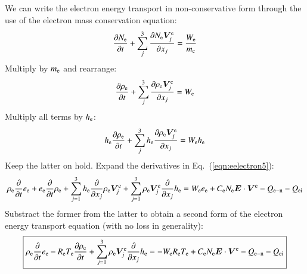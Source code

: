 \documentclass{warpdoc}
\newcommand\frameeqn[1]{\fbox{$\displaystyle #1$}}
\renewcommand{\vec}[1]{\bm{#1}}
\begin{document}
We can write the electron energy transport in non-conservative form through the use of the electron mass conservation equation:
%
\begin{equation}
\frac{\partial N_{\rm e}}{\partial t} + \sum_j^3 \frac{\partial N_{\rm e} \vec{V}^{\rm e}_j}{\partial x_j} = \frac{W_{\rm e}}{m_{\rm e}}
\end{equation}
%
Multiply by $m_{\rm e}$ and rearrange:
%
\begin{equation}
\frac{\partial \rho_{\rm e}}{\partial t} + \sum_j^3 \frac{\partial \rho_{\rm e} \vec{V}^{\rm e}_j}{\partial x_j} =  W_{\rm e}
\end{equation}
%
Multiply all terms by $h_{\rm e}$:
%
\begin{equation}
h_{\rm e} \frac{\partial \rho_{\rm e}}{\partial t} + \sum_j^3 h_{\rm e}  \frac{\partial \rho_{\rm e} \vec{V}^{\rm e}_j}{\partial x_j} =  W_{\rm e} h_{\rm e} 
\end{equation}
%
Keep the latter on hold. Expand the derivatives in Eq.\ (\ref{eqn:eelectron5}):
%
\begin{equation}
 \rho_{\rm e} \frac{\partial }{\partial t} e_{\rm e} 
 + e_{\rm e}\frac{\partial }{\partial t}\rho_{\rm e}   
 + \sum_{j=1}^3  h_{\rm e} \frac{\partial }{\partial x_j} \rho_{\rm e} \vec{V}^{\rm e}_j  
 + \sum_{j=1}^3  \rho_{\rm e} \vec{V}^{\rm e}_j \frac{\partial }{\partial x_j}  h_{\rm e} 
= 
 W_{\rm e} e_{\rm e}
+   C_{\rm e} N_{\rm e} \vec{E} \cdot \vec{V}^{\rm e}  
- Q_{\rm e-n}
- Q_{\rm ei}
\end{equation}
%  
Substract the former from the latter to obtain a second form of the electron energy transport equation (with no loss in generality):
%
\begin{equation}
\frameeqn{
 \rho_{\rm e} \frac{\partial }{\partial t} e_{\rm e} 
 - R_{\rm e} T_{\rm e} \frac{\partial \rho_{\rm e}}{\partial t}
 + \sum_{j=1}^3  \rho_{\rm e} \vec{V}^{\rm e}_j \frac{\partial }{\partial x_j}  h_{\rm e} 
= 
-W_{\rm e} R_{\rm e} T_{\rm e}
+   C_{\rm e} N_{\rm e} \vec{E} \cdot \vec{V}^{\rm e}  
- Q_{\rm e-n}
- Q_{\rm ei}
}
\label{eqn:eelectron6}
\end{equation}
%  
\end{document}
